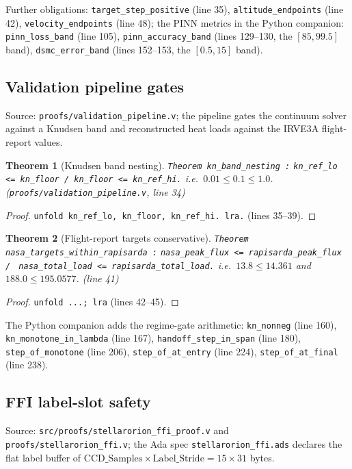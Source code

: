 \documentclass[11pt]{article}
\newtheorem{theorem}{Theorem}
\theoremstyle{definition}
\begin{document}
Further obligations: \texttt{target\_step\_positive} (line 35),
\texttt{altitude\_endpoints} (line 42), \texttt{velocity\_endpoints}
(line 48); the PINN metrics in the Python companion:
\texttt{pinn\_loss\_band} (line 105), \texttt{pinn\_accuracy\_band}
(lines 129--130, the $[85, 99.5]$ band),
\texttt{dsmc\_error\_band} (lines 152--153, the $[0.5, 15]$ band).

\subsection{Validation pipeline gates}\label{sec:valpipe}

Source: \texttt{proofs/validation\_pipeline.v}; the pipeline gates the
continuum solver against a Knudsen band and reconstructed heat loads
against the IRVE3A flight-report values.

\begin{theorem}[Knudsen band nesting]\label{thm:kn-band}
\texttt{Theorem kn\_band\_nesting :}
\texttt{kn\_ref\_lo <= kn\_floor /\ kn\_floor <= kn\_ref\_hi.}
i.e.\ $0.01 \le 0.1 \le 1.0$. (\texttt{proofs/validation\_pipeline.v}, line 34)
\end{theorem}
\begin{proof}
\verb|unfold kn_ref_lo, kn_floor, kn_ref_hi. lra.| (lines 35--39).
\end{proof}

\begin{theorem}[Flight-report targets conservative]\label{thm:nasa}
\texttt{Theorem nasa\_targets\_within\_rapisarda :}
\texttt{nasa\_peak\_flux <= rapisarda\_peak\_flux /\ }
\texttt{nasa\_total\_load <= rapisarda\_total\_load.}
i.e.\ $13.8 \le 14.361$ and $188.0 \le 195.0577$. (line 41)
\end{theorem}
\begin{proof}
\verb|unfold ...; lra| (lines 42--45).
\end{proof}

The Python companion adds the regime-gate arithmetic:
\texttt{kn\_nonneg} (line 160), \texttt{kn\_monotone\_in\_lambda} (line 167),
\texttt{handoff\_step\_in\_span} (line 180),
\texttt{step\_of\_monotone} (line 206), \texttt{step\_of\_at\_entry}
(line 224), \texttt{step\_of\_at\_final} (line 238).

\subsection{FFI label-slot safety}\label{sec:ffi}

Source: \texttt{src/proofs/stellarorion\_ffi\_proof.v} and
\texttt{proofs/stellarorion\_ffi.v}; the Ada spec
\texttt{stellarorion\_ffi.ads} declares the flat label buffer of
$\mathrm{CCD\_Samples} \times \mathrm{Label\_Stride} = 15 \times 31$
bytes.
\end{document}
